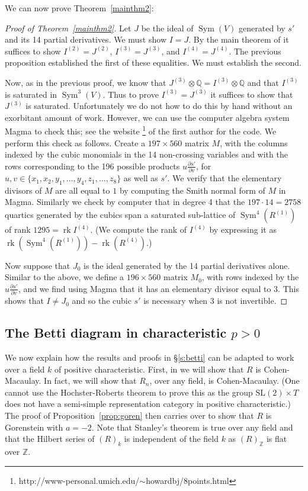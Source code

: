 \documentclass{amsart}
\theoremstyle{definition}
\theoremstyle{remark}
\DeclareMathOperator{\Sym}{Sym}
\DeclareMathOperator{\rk}{rk}
\def\SL{\mathrm{SL}}
\def\Z{\mathbb{Z}}
\def\Q{\mathbb{Q}}
\begin{document}
We can now prove Theorem~\ref{mainthm2}:

\begin{proof}[Proof of Theorem~\ref{mainthm2}]
Let $J$ be the ideal of $\Sym(V)$ generated by $s'$ and its 14 partial
derivatives.  We must show $I=J$.  By the main theorem of \cite{hmsv1} it suffices
to show $I^{(2)}=J^{(2)}$, $I^{(3)}=J^{(3)}$, and $I^{(4)} = J^{(4)}$.
The previous proposition
established the first of these equalities.  We must establish the second.

Now, as in the previous proof, we know that $J^{(3)} \otimes \Q=I^{(3)}
\otimes \Q$ and that $I^{(3)}$ is saturated in $\Sym^3(V)$.  Thus to prove
$I^{(3)}=J^{(3)}$ it suffices to show that $J^{(3)}$ is saturated.
Unfortunately we do not how to do this by hand without an exorbitant amount
of work.  However, we can use the computer algebra system Magma \cite{Magma}
to check this; see the website%
\footnote{http://www-personal.umich.edu/$\sim$howardbj/8points.html}
of the first author for the code.  We perform this check as follows.
Create a $197 \times 560$ matrix $M$, with the columns indexed by the cubic
monomials in the 14 non-crossing variables and with the rows corresponding to
the 196 possible products $u \frac{\partial s'}{\partial v}$, for $u, v
\in \{x_1, x_2, y_1, \ldots, y_4, z_1, \ldots, z_8\}$ as well as $s'$.  We
verify that the elementary divisors of $M$ are all equal to $1$ by computing
the Smith normal form of $M$ in Magma.  Similarly we check by computer 
that in degree 4 that the $197 \cdot 14=2758$ quartics generated by 
the cubics span a saturated sub-lattice of $\Sym^4(R^{(1)})$ of rank $1295
=\rk{I^{(4)}}$.  (We compute the rank of $I^{(4)}$ by expressing it as
$\rk(\Sym^4(R^{(1)}))-\rk(R^{(4)})$.)


Now suppose that $J_0$ is the ideal generated by the 14 partial derivatives
alone.  Similar to the above, we define a $196 \times 560$ matrix $M_0$, with
rows indexed by the $u \frac{\partial s'}{\partial v}$, and we find using Magma
that it has an elementary divisor equal to $3$.  This shows that $I \ne J_0$
and so the cubic $s'$ is necessary when 3 is not invertible.
\end{proof}


\subsection{The Betti diagram in characteristic $p > 0$}

We now explain how the results and proofs in \S \ref{s:betti} can be adapted to
work over a field $k$ of positive characteristic.  First, in \cite{HMSV} we will
show that $R$ is Cohen-Macaulay.  In fact, we will show that $R_n$, over any
field, is Cohen-Macaulay.  (One cannot use the Hochster-Roberts theorem to prove
this as the group $\SL(2) \times T$ does not have a semi-simple representation
category in positive characteristic.)  The proof of Proposition~\ref{prop:goren}
then carries over to show that $R$ is Gorenstein with $a=-2$.  Note that
Stanley's theorem is true over any field and that the Hilbert series of $(R)_k$
is independent of the field $k$ as $(R)_{\Z}$ is flat over $\Z$.
\end{document}
